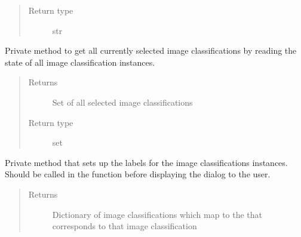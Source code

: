 \documentclass[letterpaper,10pt,english]{sphinxmanual}
\begin{document}
\begin{fulllineitems}
\begin{fulllineitems}
\begin{quote}
\begin{description}
\item[{Return type}] \leavevmode
str

\end{description}\end{quote}

\end{fulllineitems}


\begin{fulllineitems}
\label{\detokenize{polo.windows:polo.windows.pptx_dialog.PptxDesignerDialog._parse_image_classifications}}
Private method to get all currently selected image classifications
by reading the state of all image classification 
 instances.
\begin{quote}\begin{description}
\item[{Returns}] \leavevmode
Set of all selected image classifications

\item[{Return type}] \leavevmode
set

\end{description}\end{quote}

\end{fulllineitems}


\begin{fulllineitems}
\label{\detokenize{polo.windows:polo.windows.pptx_dialog.PptxDesignerDialog._set_up_image_classification_checkboxes}}
Private method that sets up the labels for the image classifications
 instances. Should be called in the  function before
displaying the dialog to the user.
\begin{quote}\begin{description}
\item[{Returns}] \leavevmode
Dictionary of image classifications which map to the  
that corresponds to that image classification


\end{description}
\end{quote}
\end{fulllineitems}
\end{fulllineitems}
\end{document}
